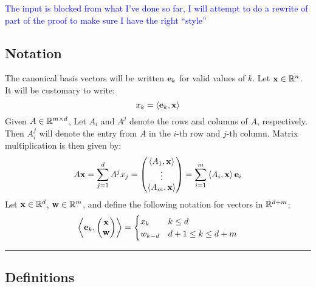 \documentclass[a4,fleqn]{article}
\begin{document}
\textcolor{blue}{The input is blocked from what I've done so far, I will attempt to do a rewrite of part of the proof to make sure I have the right ``style''}

\newcommand{\bset}[1]{\left\{#1\right\}}
\newcommand{\hcone}[1]{\bset{\x \in \R^d \suchthat #1\x \leq \vec{0}}}
\newcommand{\vcone}[1]{\bset{\x \in \R^d \suchthat 
                            \exists \t \in\R^n\geq \vec{0},\, \x = #1\t}}
\newcommand{\mdef}[3]{#1 \in \R^{#2 \times #3}}
\newcommand{\hplane}[2]{\bset{\x \in \R^{#1} \suchthat x_{#2} = 0}}
\newcommand{\svec}[2]{\begin{pmatrix*}[c] #1 \\ #2 \end{pmatrix*}}

\newcommand{\uvsum}{\sum_{\substack{ i \in P \\ j \in N }}}

\subsection{Notation}  
The canonical basis vectors will be written $\mathbf{e}_k$ for valid values of $k$.  Let $\mathbf{x} \in \mathbb{R}^n$.  It will be customary to write:
  \[x_k = \left\langle \mathbf{e}_k, \mathbf{x} \right\rangle\]
Given $\mdef{A}{m}{d}$, Let $A_i$ and $A^j$ denote the rows and columns of $A$, respectively.  Then $A^j_i$ will denote the entry from $A$ in the $i$-th row and $j$-th column.  Matrix multiplication is then given by:
\[ A\mathbf{x} = \sum_{j=1}^{d} A^j x_j = 
  \begin{pmatrix} 
    \left\langle A_1, \mathbf{x} \right\rangle \\ \vdots \\ \left\langle A_m, \mathbf{x} \right\rangle
  \end{pmatrix} =
  \sum_{i=1}^m \left\langle A_i, \mathbf{x} \right\rangle \mathbf{e}_i
\]
Let $\mathbf{x} \in \mathbb{R}^d$, $\mathbf{w} \in \mathbb{R}^m$, and define the following notation for vectors in $\mathbb{R}^{d+m}$:
\begin{align*}
  \dotproduct{\e_k}{\svec{\x}{\w}} = 
    \begin{cases} x_k     & k \leq d \\
                  w_{k-d} & d+1 \leq k \leq d+m
    \end{cases}
\end{align*}

\hrule \bigskip

\subsection {Definitions}
\end{document}
